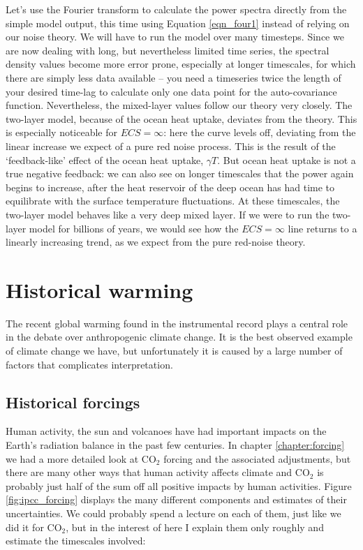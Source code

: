 \documentclass[12pt]{book}
\begin{document}
Let's use the Fourier transform to calculate the power spectra  directly from the simple model output, this time using Equation \ref{eqn_four1} instead of relying on our noise theory. We will have to run the model over many timesteps. Since we are now dealing with long, but nevertheless limited time series, the spectral density values become more error prone, especially at longer timescales, for which there are simply less data available -- you need a timeseries twice the length of your desired time-lag to calculate only one data point for the auto-covariance function. Nevertheless, the mixed-layer values follow our theory very closely. The two-layer model, because of the ocean heat uptake, deviates from the theory. This is especially noticeable for $ECS=\infty$: here the curve levels off, deviating from the linear increase we expect of a pure red noise process. This is the result of the `feedback-like' effect of the ocean heat uptake, $\gamma T$. But ocean heat uptake is not a true negative feedback: we can also see on longer timescales that the power again begins to increase, after the heat reservoir of the deep ocean has had time to equilibrate with the surface temperature fluctuations. At these timescales, the two-layer model behaves like a very deep mixed layer. If we were to run the two-layer model for billions of years, we would see how the $ECS=\infty$ line returns to a linearly increasing trend, as we expect from the pure red-noise theory.
\chapter{Historical warming}
\label{chapter:historical}

The recent global warming found in the instrumental record plays a central role in the debate over anthropogenic climate change. It is the best observed example of climate change we have, but unfortunately it is caused by a large number of factors that complicates interpretation.

\section{Historical forcings}
Human activity, the sun and volcanoes have had important impacts on the Earth's radiation balance in the past few centuries. In chapter \ref{chapter:forcing} we had a more detailed look at CO$_2$ forcing and the associated adjustments, but there are many other ways that human activity affects climate and CO$_2$ is probably just half of the sum off all positive impacts by human activities. Figure \ref{fig:ipcc_forcing} displays the many different components and estimates of their uncertainties. We could probably spend a lecture on each of them, just like we did it for CO$_2$, but in the interest of here I explain them only roughly and estimate the timescales involved:
\end{document}
